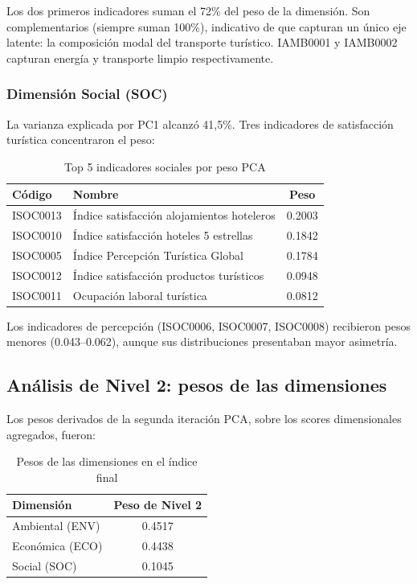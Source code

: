 Los dos primeros indicadores suman el 72\% del peso de la dimensión. Son complementarios (siempre suman 100\%), indicativo de que capturan un único eje latente: la composición modal del transporte turístico. IAMB0001 y IAMB0002 capturan energía y transporte limpio respectivamente.

\subsubsection{Dimensión Social (SOC)}

La varianza explicada por PC1 alcanzó 41,5\%. Tres indicadores de satisfacción turística concentraron el peso:

\begin{table}[H]
    \centering
    \small
    \begin{tabular}{llc}
        \toprule
        \textbf{Código} & \textbf{Nombre} & \textbf{Peso} \\
        \midrule
        ISOC0013 & Índice satisfacción alojamientos hoteleros & 0.2003 \\
        ISOC0010 & Índice satisfacción hoteles 5 estrellas & 0.1842 \\
        ISOC0005 & Índice Percepción Turística Global & 0.1784 \\
        ISOC0012 & Índice satisfacción productos turísticos & 0.0948 \\
        ISOC0011 & Ocupación laboral turística & 0.0812 \\
        \bottomrule
    \end{tabular}
    \caption{Top 5 indicadores sociales por peso PCA}
    \label{tab:pesos_soc_top5}
\end{table}

Los indicadores de percepción (ISOC0006, ISOC0007, ISOC0008) recibieron pesos menores (0.043--0.062), aunque sus distribuciones presentaban mayor asimetría.

\subsection{Análisis de Nivel 2: pesos de las dimensiones}

Los pesos derivados de la segunda iteración PCA, sobre los scores dimensionales agregados, fueron:

\begin{table}[H]
    \centering
    \begin{tabular}{lc}
        \toprule
        \textbf{Dimensión} & \textbf{Peso de Nivel 2} \\
        \midrule
        Ambiental (ENV) & 0.4517 \\
        Económica (ECO) & 0.4438 \\
        Social (SOC) & 0.1045 \\
        \bottomrule
    \end{tabular}
    \caption{Pesos de las dimensiones en el índice final}
    \label{tab:pesos_dim}
\end{table}

